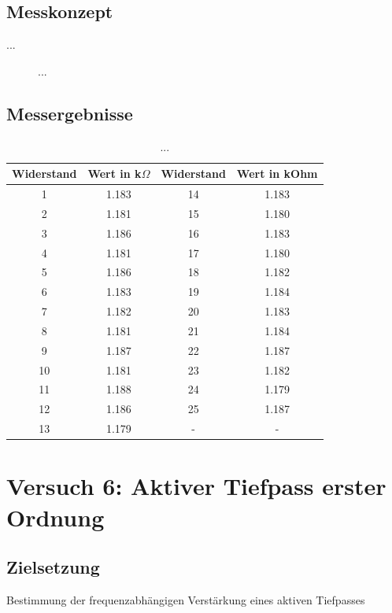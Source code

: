 \documentclass[a4paper,12pt]{article}
\begin{document}
\subsection{Messkonzept}
...

\begin{figure}[H]
    \centering
\caption{...}
\end{figure}


\subsection{Messergebnisse}
\begin{table}[H]
	\centering
	\begin{tabular}{|c|c|c|c|}
		\hline
		Widerstand & Wert in k$\Omega$ & Widerstand & Wert in kOhm \\
		\hline
		1 & 1.183 & 14 & 1.183 \\
		2 & 1.181 & 15 & 1.180 \\
		3 & 1.186 & 16 & 1.183 \\
		4 & 1.181 & 17 & 1.180 \\
		5 & 1.186 & 18 & 1.182 \\
		6 & 1.183 & 19 & 1.184 \\
		7 & 1.182 & 20 & 1.183 \\
		8 & 1.181 & 21 & 1.184 \\
		9 & 1.187 & 22 & 1.187 \\
		10 & 1.181 & 23 & 1.182 \\
		11 & 1.188 & 24 & 1.179 \\
		12 & 1.186 & 25 & 1.187 \\
		13 & 1.179 & - & - \\
		\hline
	\end{tabular}
	\caption{...}
\end{table}

\section{Versuch 6: Aktiver Tiefpass erster Ordnung}
\subsection{Zielsetzung}
Bestimmung der frequenzabhängigen Verstärkung eines aktiven Tiefpasses
\end{document}
